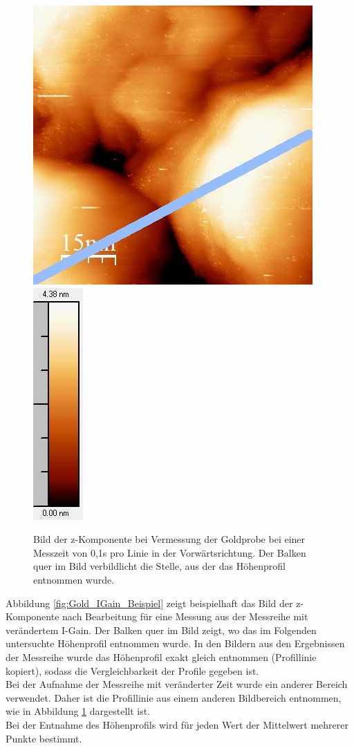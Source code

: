 \documentclass[12pt,a4paper]{article}
\begin{document}
\begin{figure}
\centering
\includegraphics[scale=0.8]{Bilder/Anhang/Zeit/0_1_Zeit_vor.jpg}
\includegraphics[scale=0.8]{Bilder/Anhang/Zeit/0_1_Zeit_vor_Skala.jpg}
\caption{Bild der z-Komponente bei Vermessung der Goldprobe bei einer Messzeit von 0,1s pro Linie in der Vorwärtsrichtung. Der Balken quer im Bild verbildlicht die Stelle, aus der das Höhenprofil entnommen wurde.}
\label{fig:Gold_Zeit_Beispiel}
\end{figure}

Abbildung \ref{fig:Gold_IGain_Beispiel} zeigt beispielhaft das Bild der z-Komponente nach Bearbeitung für eine Messung aus der Messreihe mit verändertem I-Gain. Der Balken quer im Bild zeigt, wo das im Folgenden untersuchte Höhenprofil entnommen wurde. In den Bildern aus den Ergebnissen der Messreihe wurde das Höhenprofil exakt gleich entnommen (Profillinie kopiert), sodass die Vergleichbarkeit der Profile gegeben ist.\\
Bei der Aufnahme der Messreihe mit veränderter Zeit wurde ein anderer Bereich verwendet. Daher ist die Profillinie aus einem anderen Bildbereich entnommen, wie in Abbildung \ref{fig:Gold_Zeit_Beispiel} dargestellt ist.\\
Bei der Entnahme des Höhenprofils wird für jeden Wert der Mittelwert mehrerer Punkte bestimmt.
\end{document}
